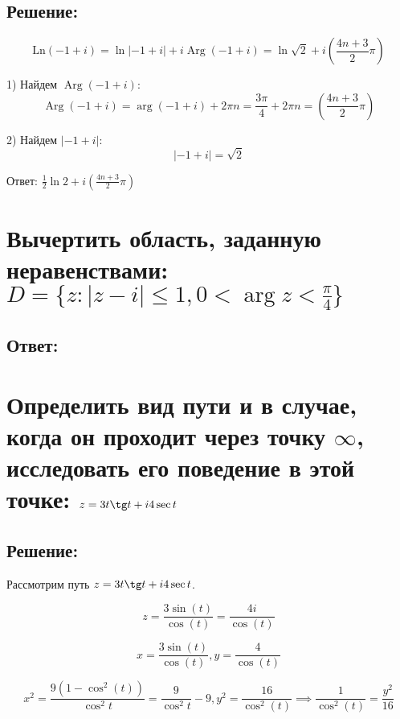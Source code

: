 \documentclass{article}
\begin{document}
\subsection{Решение:}

\[
\text{Ln}(-1 + i) = \ln| -1 + i | + i \operatorname{Arg} (-1 + i) = \ln\sqrt{2} + i \left( \frac{4n + 3}{2} \pi \right)
\]

1) Найдем $\operatorname{Arg} (-1 + i)$:
\[
\operatorname{Arg} (-1 + i) = \operatorname{arg} (-1 + i) + 2\pi n = \frac{3\pi}{4} + 2\pi n = \left( \frac{4n + 3}{2} \pi \right)
\]

2) Найдем $| -1 + i |$:
\[
| -1 + i | = \sqrt{2}
\]

Ответ: $\frac{1}{2} \ln 2 + i \left( \frac{4n + 3}{2} \pi \right)$

\section{Вычертить область, заданную неравенствами: $D = \{z : |z - i| \leq 1, 0 < \arg z < \frac{\pi}{4} \}$}
\subsection{Ответ:}

\section{Определить вид пути и в случае, когда он проходит через точку $\infty$, исследовать его поведение в этой точке: $z = 3t \tg t + i4 \sec t$}
\subsection{Решение:}

Рассмотрим путь $z = 3t \tg t + i4 \sec t$.

\[
z = \frac{3\sin(t)}{\cos(t)} = \frac{4i}{\cos(t)}
\]

\[
x = \frac{3\sin(t)}{\cos(t)}, y = \frac{4}{\cos(t)} 
\]


\[
x^2 = \frac{9(1 - \cos^2(t))}{\cos^2{t}} = \frac{9}{\cos^2{t}} - 9, y^2 = \frac{16}{\cos^2(t)} \implies \frac{1}{\cos^2(t)} = \frac{y^2}{16}
\]
\end{document}
